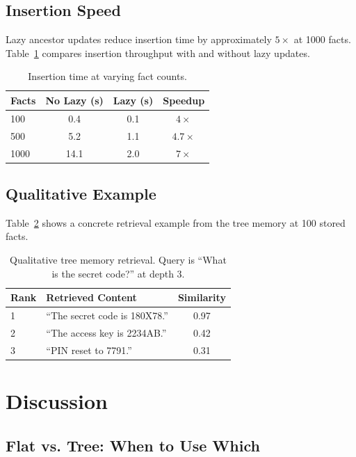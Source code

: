 \documentclass[conference]{IEEEtran}
\begin{document}
\subsection{Insertion Speed}

Lazy ancestor updates reduce insertion time by approximately $5\times$ at 1000 facts. Table~\ref{tab:insertion} compares insertion throughput with and without lazy updates.

\begin{table}[t]
\centering
\caption{Insertion time at varying fact counts.}
\label{tab:insertion}
\begin{tabular}{lccc}
\toprule
Facts & No Lazy (s) & Lazy (s) & Speedup \\
\midrule
100   & 0.4         & 0.1      & $4\times$  \\
500   & 5.2         & 1.1      & $4.7\times$ \\
1000  & 14.1        & 2.0      & $7\times$  \\
\bottomrule
\end{tabular}
\end{table}

\subsection{Qualitative Example}

Table~\ref{tab:example} shows a concrete retrieval example from the tree memory at 100 stored facts.

\begin{table}[t]
\centering
\caption{Qualitative tree memory retrieval. Query is ``What is the secret code?'' at depth 3.}
\label{tab:example}
\begin{tabular}{llc}
\toprule
Rank & Retrieved Content & Similarity \\
\midrule
1 & ``The secret code is 180X78.'' & 0.97 \\
2 & ``The access key is 2234AB.''  & 0.42 \\
3 & ``PIN reset to 7791.''         & 0.31 \\
\bottomrule
\end{tabular}
\end{table}

\section{Discussion}

\subsection{Flat vs. Tree: When to Use Which}
\end{document}
